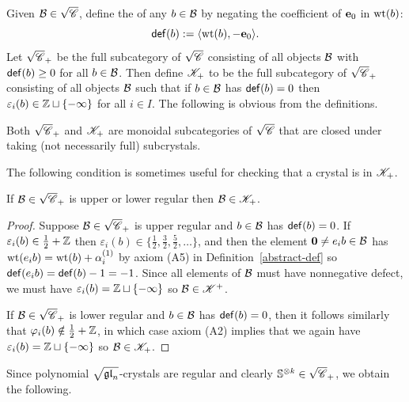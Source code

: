 \documentclass[11pt]{article}
\begin{document}
Given $\mathcal{B} \in \sqrt{\mathscr{C}}$, define the  of any $b \in \mathcal{B}$ by negating the coefficient of $\textbf{e}_0$ in $\operatorname{wt}(b)$:
\begin{equation}
\label{eq:defect}
\mathsf{def}(b) := \langle \operatorname{wt}(b), -\textbf{e}_0 \rangle.
\end{equation}
Let $\sqrt{\mathscr{C}}_+$ be the full subcategory of $\sqrt{\mathscr{C}}$ consisting of all objects $\mathcal{B}$ with $\mathsf{def}(b) \geq 0$ for all $b \in \mathcal{B}$.
Then define $\mathscr{K}_+$ to be the full subcategory of $\sqrt{\mathscr{C}}_+$ consisting of all objects $\mathcal{B}$ such that if $b \in \mathcal{B}$ has $\mathsf{def}(b) = 0$ then $\varepsilon_i(b) \in \mathbb{Z}\sqcup \{-\infty\}$ for all $i \in I$.
The following is obvious from the definitions.



\begin{proposition}
\label{prop:plus_monoidal_cat}
Both $\sqrt{\mathscr{C}}_+$ and $\mathscr{K}_+$ are monoidal subcategories of $\sqrt{\mathscr{C}}$ that are closed under taking (not necessarily full) subcrystals.
\end{proposition}


The following condition is sometimes useful for checking that a crystal is in $\mathscr{K}_+$.


 \begin{proposition}\label{shortcut-prop}
 If $\mathcal{B} \in\sqrt{\mathscr{C}}_+$ is upper or lower regular then $\mathcal{B} \in \mathscr{K}_+$.
 \end{proposition}
 
 \begin{proof}
 Suppose $\mathcal{B} \in \sqrt{\mathscr{C}}_+$ is upper regular and $b \in \mathcal{B}$
 has $\mathsf{def}(b)=0$. If $\varepsilon_i(b) \in \frac{1}{2}+\mathbb{Z}$ then   $\varepsilon_i(b) \in \{\frac{1}{2}, \frac{3}{2}, \frac{5}{2},\dots\}$, and then the element $\boldsymbol{0} \neq e_i b \in \mathcal{B}$ has
 $\operatorname{wt}(e_ib)=\operatorname{wt}(b)+\alpha_i^{(1)}$ by axiom (A5) in Definition~\ref{abstract-def} so
  $\mathsf{def}(e_ib) = \mathsf{def}(b) - 1 =-1$. 
 Since all elements of $\mathcal{B}$ must have nonnegative defect,   we must have $\varepsilon_i(b) = \mathbb{Z}\sqcup\{-\infty\}$
so $\mathcal{B} \in \mathscr{K}^+$.

 If $\mathcal{B} \in \sqrt{\mathscr{C}}_+$ is lower regular and $b\in \mathcal{B}$ has $\mathsf{def}(b)=0$,
then it follows similarly that $\varphi_i(b) \notin \frac{1}{2}+\mathbb{Z}$,
in which case axiom (A2) implies that we again have  $\varepsilon_i(b) = \mathbb{Z}\sqcup\{-\infty\}$
so $\mathcal{B} \in \mathscr{K}_+$.
 \end{proof}
 
Since polynomial $\sqrt{\mathfrak{gl}_n}$-crystals are regular and clearly $ \mathbb{S}^{\otimes k} \in \sqrt{\mathscr{C}}_+$, we obtain the following. %
\end{document}
